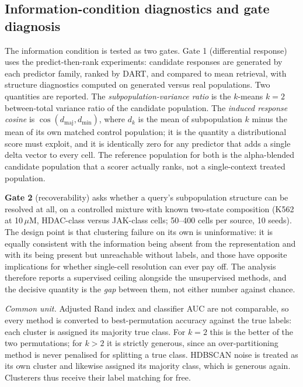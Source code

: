 \documentclass[11pt,letterpaper]{article}
\begin{document}
\subsection*{Information-condition diagnostics and gate diagnosis}

The information condition is tested as two gates. Gate 1 (differential response)
uses the predict-then-rank experiments: candidate responses are generated by each predictor
family, ranked by DART, and compared to mean retrieval, with structure diagnostics computed
on generated versus real populations. Two quantities are reported. The
\emph{subpopulation-variance ratio} is the $k$-means $k{=}2$ between-total variance ratio of
the candidate population. The \emph{induced response cosine} is
$\cos(d_{\mathrm{maj}}, d_{\mathrm{min}})$, where $d_k$ is the mean of subpopulation $k$
minus the mean of its own matched control population; it is the quantity a distributional
score must exploit, and it is identically zero for any predictor that adds a single delta
vector to every cell. The reference population for both is the alpha-blended candidate
population that a scorer actually ranks, not a single-context treated population.

\textbf{Gate 2} (recoverability) asks whether a query's subpopulation structure can be resolved at
all, on a controlled mixture with known two-state composition (K562 at 10\,$\mu$M, HDAC-class
versus JAK-class cells; 50--400 cells per source, 10 seeds). The design point is that clustering
failure on its own is uninformative: it is equally consistent with the information being absent
from the representation and with its being present but unreachable without labels, and those have
opposite implications for whether single-cell resolution can ever pay off. The analysis therefore
reports a supervised ceiling alongside the unsupervised methods, and the decisive quantity
is the \emph{gap} between them, not either number against chance.

\emph{Common unit.} Adjusted Rand index and classifier AUC are not comparable, so every method is
converted to best-permutation accuracy against the true labels: each cluster is assigned its
majority true class. For $k = 2$ this is the better of the two permutations; for $k > 2$ it is
strictly generous, since an over-partitioning method is never penalised for splitting a true class.
HDBSCAN noise is treated as its own cluster and likewise assigned its majority class, which is
generous again. Clusterers thus receive their label matching for free.
\end{document}
